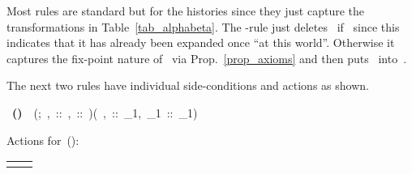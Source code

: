 \documentclass{entcs}
\newcommand{\pea}[2]{\langle#1\rangle #2}
\newcommand{\psp}[2]{#1;#2}
\newcommand{\tnode}[3]{(#1 :: #2 :: #3)}
\newcommand{\tnext}{\mathrm{Nx}}
\newcommand{\tbdia}{\mathrm{BD}}
\newcommand{\tuev}{\mathrm{uev}}
\newcommand{\tres}{}
\newcommand{\trar}{}
\newcommand{\ruleone}[3]{
\mbox{ {\bf #1} \ #2#3}}
\begin{document}
Most rules are standard but for the histories
since they just capture the transformations in Table~\ref{tab_alphabeta}.
The \trar{}-rule just deletes~ 
if~ since this indicates
that it has already been expanded once ``at this world''.
Otherwise it captures the fix-point nature of~ via Prop.~\ref{prop_axioms}
and then puts~ into~.

The next two rules have individual side-conditions and actions as shown.
\begin{center}
  \ruleone{(\tres{})}
  {\tnode{\pea{\psp{\alpha}{\beta}}{\varphi} , \; \Gamma}{\tnext, \tbdia}{\tuev}}
  {\tnode{\pea{\alpha}{\pea{\beta}{\varphi}} , \; \Gamma}{\tnext_1, \tbdia_1}{\tuev_1}}
  
\end{center}
\begin{flushleft}
  Actions for~(\tres{}): \ \\
  \begin{tabular}[c]{lr}
    \begin{minipage}[l]{0.28\linewidth}
      
    \end{minipage}
    &
    \begin{minipage}[l]{0.72\linewidth}
      
    \end{minipage}
  \end{tabular}
\end{flushleft}
\end{document}
